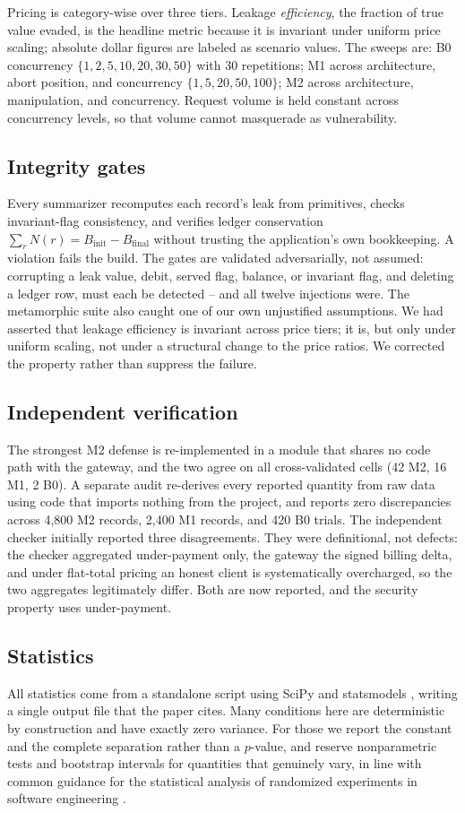 \documentclass[final,5p,times,twocolumn,number]{elsarticle}
\begin{document}
Pricing is category-wise over three tiers. Leakage \emph{efficiency}, the fraction of
true value evaded, is the headline metric because it is invariant under uniform price
scaling; absolute dollar figures are labeled as scenario values. The sweeps are: B0
concurrency $\{1,2,5,10,20,30,50\}$ with 30 repetitions; M1 across architecture, abort
position, and concurrency $\{1,5,20,50,100\}$; M2 across architecture, manipulation, and
concurrency. Request volume is held constant across concurrency levels, so that volume
cannot masquerade as vulnerability.

\subsection{Integrity gates}
Every summarizer recomputes each record's leak from primitives, checks invariant-flag
consistency, and verifies ledger conservation $\sum_r N(r) = B_{\mathrm{init}} -
B_{\mathrm{final}}$ without trusting the application's own bookkeeping. A violation fails
the build. The gates are validated adversarially, not assumed: corrupting a leak value,
debit, served flag, balance, or invariant flag, and deleting a ledger row, must each be
detected -- and all twelve injections were. The metamorphic suite also caught
one of our own unjustified assumptions. We had asserted that leakage efficiency is
invariant across price tiers; it is, but only under uniform scaling, not under a
structural change to the price ratios. We corrected the property rather than suppress the
failure.

\subsection{Independent verification}
The strongest M2 defense is re-implemented in a module that shares no code path with the
gateway, and the two agree on all cross-validated cells (42 M2, 16 M1, 2 B0). A separate
audit re-derives every reported quantity from raw data using code that imports nothing
from the project, and reports zero discrepancies across 4{,}800 M2 records, 2{,}400 M1
records, and 420 B0 trials. The independent checker initially reported three
disagreements. They were definitional, not defects: the checker aggregated under-payment
only, the gateway the signed billing delta, and under flat-total pricing an honest client
is systematically overcharged, so the two aggregates legitimately differ. Both are now
reported, and the security property uses under-payment.

\subsection{Statistics}
All statistics come from a standalone script using SciPy \citep{scipy} and statsmodels
\citep{statsmodels}, writing a
single output file that the paper cites. Many conditions here are deterministic by
construction and have exactly zero variance. For those we report the constant and the
complete separation rather than a $p$-value, and reserve nonparametric tests and
bootstrap intervals \citep{efron} for quantities that genuinely vary, in line with common
guidance for the statistical analysis of randomized experiments in software engineering
\citep{arcuri}.
\end{document}
